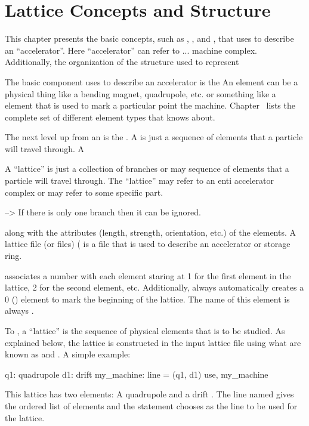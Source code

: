 \chapter{Lattice Concepts and Structure}
\label{c:lat.concepts}

This chapter presents the basic concepts, such as ,
, and , that \bmad uses to describe an
``accelerator''. Here ``accelerator'' can refer to ... machine
complex. Additionally, the organization of the structure used to
represent

The basic component \bmad uses to describe an accelerator is the
 An element can be a physical thing like a bending magnet,
quadrupole, etc. or something like a  element that is used
to mark a particular point the machine. Chapter~
lists the complete set of different element types that \bmad knows
about.

The next level up from an  is the .  A
 is just a sequence of elements that a particle will travel
through. A 


A ``lattice'' is just a collection of branches or may sequence of
elements that a particle will travel through. The ``lattice'' may
refer to an enti accelerator complex or may refer to some specific
part.

--> If there is only one branch then it can be ignored.


along with the attributes (length, strength, orientation,
etc.) of the elements.  A lattice file (or files) (
is a file that is used to describe an accelerator or storage ring.

\bmad associates a number with each element staring at 1 for the first
element in the lattice, 2 for the second element, etc. Additionally,
\bmad always automatically creates a 0\Th {}
() element to mark the beginning of the lattice. The
name of this element is always .


To \bmad, a ``lattice'' is the sequence of physical elements that is
to be studied. As explained below, the lattice is constructed in the
input lattice file using what are known as  and
. A simple example:
\begin{example}
  q1: quadrupole
  d1: drift
  my_machine: line = (q1, d1)
  use, my_machine
\end{example}
This lattice has two elements: A quadrupole  and a drift
.  The line named  gives the ordered list of
elements and the  statement chooses  as the
line to be used for the lattice.

